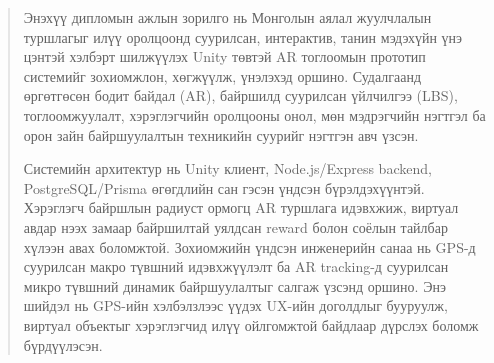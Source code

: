 \begin{abstract}

\begin{sloppy}
Энэхүү дипломын ажлын зорилго нь Монголын аялал жуулчлалын туршлагыг илүү оролцоонд суурилсан, интерактив, танин мэдэхүйн үнэ цэнтэй хэлбэрт шилжүүлэх Unity төвтэй AR тоглоомын прототип системийг зохиомжлон, хөгжүүлж, үнэлэхэд оршино. Судалгаанд өргөтгөсөн бодит байдал (AR), байршилд суурилсан үйлчилгээ (LBS), тоглоомжуулалт, хэрэглэгчийн оролцооны онол, мөн мэдрэгчийн нэгтгэл ба орон зайн байршуулалтын техникийн суурийг нэгтгэн авч үзсэн.

Системийн архитектур нь Unity клиент, Node.js/Express backend, PostgreSQL/Prisma өгөгдлийн сан гэсэн үндсэн бүрэлдэхүүнтэй. Хэрэглэгч байршлын радиуст ормогц AR туршлага идэвхжиж, виртуал авдар нээх замаар байршилтай уялдсан reward болон соёлын тайлбар хүлээн авах боломжтой. Зохиомжийн үндсэн инженерийн санаа нь GPS-д суурилсан макро түвшний идэвхжүүлэлт ба AR tracking-д суурилсан микро түвшний динамик байршуулалтыг салгаж үзсэнд оршино. Энэ шийдэл нь GPS-ийн хэлбэлзлээс үүдэх UX-ийн доголдлыг бууруулж, виртуал объектыг хэрэглэгчид илүү ойлгомжтой байдлаар дүрслэх боломж бүрдүүлэсэн.
\end{sloppy}

\end{abstract}
